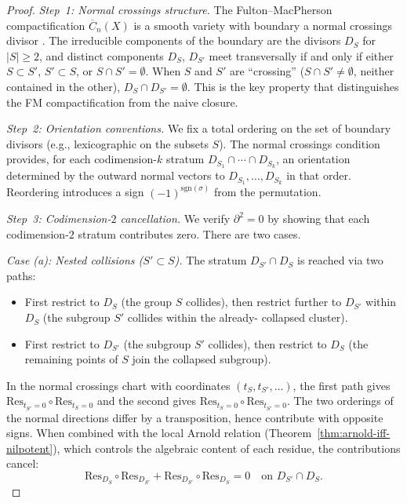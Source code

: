 \begin{proof}
\emph{Step~1: Normal crossings structure.}
The Fulton--MacPherson compactification $\overline{C}_n(X)$ is a smooth
variety with boundary a normal crossings divisor
\cite{FM94}.  The irreducible components of the boundary are
the divisors $D_S$ for $|S| \geq 2$, and distinct components $D_S$,
$D_{S'}$ meet transversally if and only if either $S \subset S'$,
$S' \subset S$, or $S \cap S' = \emptyset$.  When $S$ and $S'$ are
``crossing'' ($S \cap S' \neq \emptyset$, neither contained in the other),
$D_S \cap D_{S'} = \emptyset$.  This is the key property that distinguishes
the FM compactification from the naive closure.

\emph{Step~2: Orientation conventions.}
We fix a total ordering on the set of boundary divisors (e.g., lexicographic
on the subsets $S$).  The normal crossings condition provides, for each
codimension-$k$ stratum $D_{S_1} \cap \cdots \cap D_{S_k}$, an orientation
determined by the outward normal vectors to $D_{S_1}, \ldots, D_{S_k}$ in
that order.  Reordering introduces a sign $(-1)^{\mathrm{sgn}(\sigma)}$ from
the permutation.

\emph{Step~3: Codimension-$2$ cancellation.}
We verify $\partial^2 = 0$ by showing that each codimension-$2$ stratum
contributes zero.  There are two cases.

\emph{Case (a): Nested collisions ($S' \subset S$).}
The stratum $D_{S'} \cap D_S$ is reached via two paths:
\begin{itemize}
\item First restrict to $D_S$ (the group $S$ collides), then restrict further
  to $D_{S'}$ within $D_S$ (the subgroup $S'$ collides within the already-
  collapsed cluster).
\item First restrict to $D_{S'}$ (the subgroup $S'$ collides), then restrict
  to $D_S$ (the remaining points of $S$ join the collapsed subgroup).
\end{itemize}
In the normal crossings chart with coordinates $(t_S, t_{S'}, \ldots)$,
the first path gives $\mathrm{Res}_{t_{S'}=0} \circ \mathrm{Res}_{t_S=0}$
and the second gives $\mathrm{Res}_{t_S=0} \circ \mathrm{Res}_{t_{S'}=0}$.
The two orderings of the normal directions differ by a transposition, hence
contribute with opposite signs.  When combined with the local Arnold relation
(Theorem~\ref{thm:arnold-iff-nilpotent}), which controls the algebraic
content of each residue, the contributions cancel:
\[
  \mathrm{Res}_{D_S} \circ \mathrm{Res}_{D_{S'}} +
  \mathrm{Res}_{D_{S'}} \circ \mathrm{Res}_{D_S} = 0
  \quad \text{on } D_{S'} \cap D_S.
\]


\end{proof}
